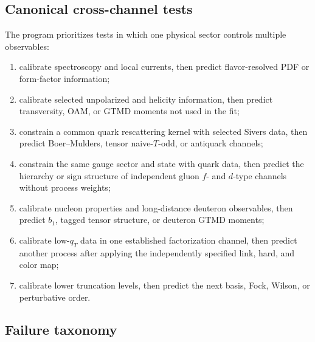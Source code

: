 \documentclass[11pt]{article}
\begin{document}
\subsection{Canonical cross-channel tests}

The program prioritizes tests in which one physical sector controls multiple
observables:
\begin{enumerate}
\item calibrate spectroscopy and local currents, then predict flavor-resolved
PDF or form-factor information;
\item calibrate selected unpolarized and helicity information, then predict
transversity, OAM, or GTMD moments not used in the fit;
\item constrain a common quark rescattering kernel with selected Sivers data,
then predict Boer--Mulders, tensor naive-\(T\)-odd, or antiquark channels;
\item constrain the same gauge sector and state with quark data, then predict
the hierarchy or sign structure of independent gluon \(f\)- and \(d\)-type
channels without process weights;
\item calibrate nucleon properties and long-distance deuteron observables,
then predict \(b_1\), tagged tensor structure, or deuteron GTMD moments;
\item calibrate low-\(q_T\) data in one established factorization channel,
then predict another process after applying the independently specified link,
hard, and color map;
\item calibrate lower truncation levels, then predict the next basis, Fock,
Wilson, or perturbative order.
\end{enumerate}

\subsection{Failure taxonomy}
\end{document}
